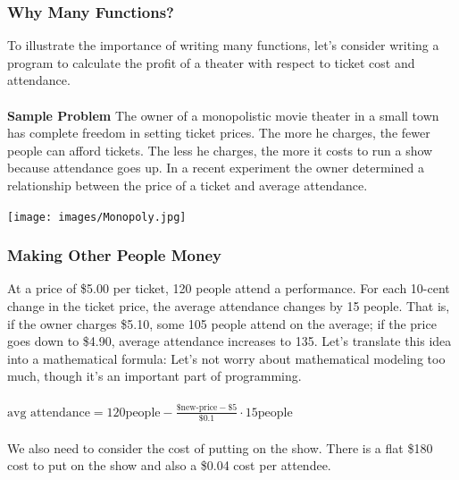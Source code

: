 \documentclass{beamer}
\begin{document}
\begin{frame}
  \frametitle{Why Many Functions?}
  To illustrate the importance of writing many functions, let's consider
  writing a program to calculate the profit of a theater with respect to
  ticket cost and attendance.
  \pause
  \\ \\
  \textbf{Sample Problem} The owner of a monopolistic movie theater in a small town has complete freedom in setting ticket prices. The more he charges, the fewer people can afford tickets. The less he charges, the more it costs to run a show because attendance goes up. In a recent experiment the owner determined a relationship between the price of a ticket and average attendance.
  \pause
  \begin{center}
    \texttt{[image: images/Monopoly.jpg]}
  \end{center}
\end{frame}

\begin{frame}
  \frametitle{Making Other People Money}
  At a price of \$5.00 per ticket, 120 people attend a performance. For each 10-cent change in the ticket price, the average attendance changes by 15 people. That is, if the owner charges \$5.10, some 105 people attend on the average; if the price goes down to \$4.90, average attendance increases to 135. Let’s translate this idea into a mathematical formula:
  \pause
  Let's not worry about mathematical modeling too much, though  it's an important
  part of programming.
  \\ \\
  \pause
  $\text{avg attendance}=120\text{people}-\frac{\text{\$new-price}-\$5}{\$0.1} \cdot 15 \text{people}$
  \\ \\
  \pause
  We also need to consider the cost of putting on the show. There is a flat \$180
  cost to put on the show and also a \$0.04 cost per attendee.
\end{frame}

\end{document}
